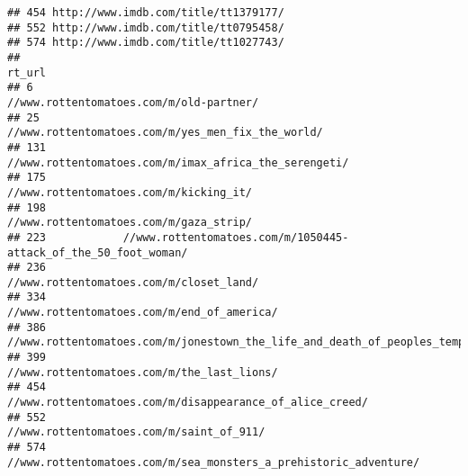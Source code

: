 \documentclass[]{article}
\newenvironment{Shaded}{\begin{snugshade}}{\end{snugshade}}
\newcommand{\KeywordTok}[1]{\textcolor[rgb]{0.13,0.29,0.53}{\textbf{#1}}}
\newcommand{\StringTok}[1]{\textcolor[rgb]{0.31,0.60,0.02}{#1}}
\newcommand{\CommentTok}[1]{\textcolor[rgb]{0.56,0.35,0.01}{\textit{#1}}}
\newcommand{\OperatorTok}[1]{\textcolor[rgb]{0.81,0.36,0.00}{\textbf{#1}}}
\newcommand{\NormalTok}[1]{#1}
\begin{document}
\begin{verbatim}
## 454 http://www.imdb.com/title/tt1379177/
## 552 http://www.imdb.com/title/tt0795458/
## 574 http://www.imdb.com/title/tt1027743/
##                                                                         rt_url
## 6                                      //www.rottentomatoes.com/m/old-partner/
## 25                           //www.rottentomatoes.com/m/yes_men_fix_the_world/
## 131                      //www.rottentomatoes.com/m/imax_africa_the_serengeti/
## 175                                     //www.rottentomatoes.com/m/kicking_it/
## 198                                     //www.rottentomatoes.com/m/gaza_strip/
## 223            //www.rottentomatoes.com/m/1050445-attack_of_the_50_foot_woman/
## 236                                    //www.rottentomatoes.com/m/closet_land/
## 334                                 //www.rottentomatoes.com/m/end_of_america/
## 386 //www.rottentomatoes.com/m/jonestown_the_life_and_death_of_peoples_temple/
## 399                                 //www.rottentomatoes.com/m/the_last_lions/
## 454                   //www.rottentomatoes.com/m/disappearance_of_alice_creed/
## 552                                   //www.rottentomatoes.com/m/saint_of_911/
## 574           //www.rottentomatoes.com/m/sea_monsters_a_prehistoric_adventure/
\end{verbatim}

\begin{Shaded}
\end{Shaded}
\end{document}
